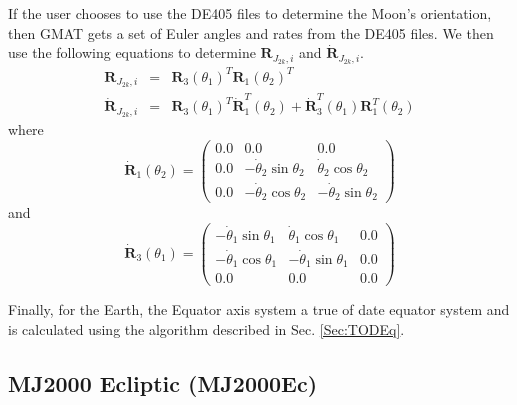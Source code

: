 {If the user chooses to use the DE405 files to determine the Moon's
orientation, then GMAT gets a set of Euler angles and rates from the
DE405 files.  We then use the following equations to determine
$\mathbf{R}_{J_{2k},i}$ and $\dot{\mathbf{R}}_{J_{2k},i}$.
%
\begin{eqnarray}
   \mathbf{R}_{J_{2k},i} &=&
   \mathbf{R}_3(\theta_1)^T\mathbf{R}_1(\theta_2)^T\\
   \dot{\mathbf{R}}_{J_{2k},i} &=&
   \mathbf{R}_3(\theta_1)^T\dot{\mathbf{R}}_1^T(\theta_2) + \dot{\mathbf{R}}_3^T(\theta_1)\mathbf{R}_1^T(\theta_2)
\end{eqnarray}
%
where
%
\begin{equation}
   \dot{\mathbf{R}}_1(\theta_2) = \begin{pmatrix}
     0.0 & 0.0 & 0.0\\
     0.0 & -\dot{\theta}_2\sin{\theta_2} & \dot{\theta}_2\cos{\theta_2}\\
     0.0 & -\dot{\theta}_2\cos{\theta_2} & -\dot{\theta}_2\sin{\theta_2}
     \end{pmatrix}
\end{equation}
%
and
%
\begin{equation}
   \dot{\mathbf{R}}_3(\theta_1) = \begin{pmatrix}
     -\dot{\theta}_1\sin{\theta_1} & \dot{\theta}_1\cos{\theta_1} & 0.0\\
     -\dot{\theta}_1\cos{\theta_1} & -\dot{\theta}_1\sin{\theta_1} & 0.0 \\
     0.0                           & 0.0                          &
     0.0
     \end{pmatrix}
\end{equation}

Finally, for the Earth, the Equator axis system a true of date
equator system and is calculated using the algorithm described in
Sec. \ref{Sec:TODEq}.
\subsection{MJ2000 Ecliptic (MJ2000Ec) } \label{Sec:MJ2000Ec} 

}
